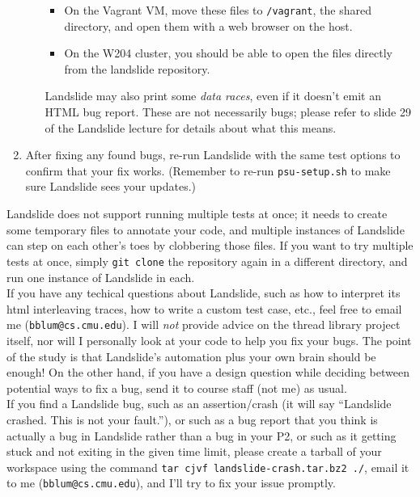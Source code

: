 \documentclass{article}
\begin{document}
\begin{enumerate}
\begin{enumerate}
				\begin{itemize}
					\item On the Vagrant VM, move these files to {\tt /vagrant}, the shared directory, and open them with a web browser on the host.
					\item On the W204 cluster, you should be able to open the files directly from the landslide repository.
				\end{itemize}
				Landslide may also print some {\em data races}, even if it doesn't emit an HTML bug report. These are not necessarily bugs; please refer to slide 29 of the Landslide lecture for details about what this means.
		\end{enumerate}
	\item After fixing any found bugs, re-run Landslide with the same test options to confirm that your fix works.
		(Remember to re-run {\tt psu-setup.sh} to make sure Landslide sees your updates.)
\end{enumerate}

 Landslide does not support running multiple tests at once;
it needs to create some temporary files to annotate your code, and multiple instances of Landslide can step on each other's toes by clobbering those files.
If you want to try multiple tests at once, simply {\tt git clone} the repository again in a different directory, and run one instance of Landslide in each.
\\


 If you have any techical questions about Landslide,
such as how to interpret its html interleaving traces,
how to write a custom test case, etc.,
feel free to email me ({\tt bblum@cs.cmu.edu}).
I will {\em not} provide advice on the thread library project itself,
nor will I personally look at your code to help you fix your bugs.
The point of
the study is that Landslide's automation plus your own brain should be enough!
On the other hand, if you have
a design question while deciding between potential ways to fix a bug, send it to \classname course staff (not me) as usual.
\\

 If you find a Landslide bug, such as an assertion/crash (it will say ``Landslide crashed. This is not your fault.''), or such as a
bug report that you think is actually a bug in Landslide rather than a bug in your P2, or such as it getting stuck
and not exiting in the given time limit, please create a tarball of your workspace
using the command {\tt tar cjvf landslide-crash.tar.bz2 ./},
email it to me ({\tt bblum@cs.cmu.edu}), and I'll try to fix your issue promptly.
\\
\end{document}
